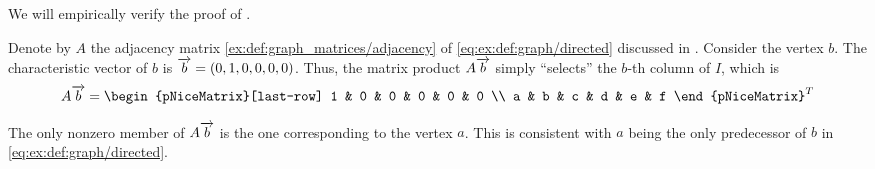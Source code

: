 \begin{example}\label{ex:thm:graphs_as_linear_transformations}
  We will empirically verify the proof of .

  Denote by \( A \) the adjacency matrix \eqref{ex:def:graph_matrices/adjacency} of \eqref{eq:ex:def:graph/directed} discussed in . Consider the vertex \( b \). The characteristic vector of \( b \) is \( \overrightarrow{b} = (0, 1, 0, 0, 0, 0) \). Thus, the matrix product \( A \overrightarrow{b} \) simply \enquote{selects} the \( b \)-th column of \( I \), which is
  \begin{equation*}
    A \vect{b}
    =
    \begin{pNiceMatrix}[last-row]
      1        & 0        & 0        & 0        & 0        & 0 \\
      a        & b        & c        & d        & e        & f
    \end{pNiceMatrix}^T
  \end{equation*}

  The only nonzero member of \( A \overrightarrow{b} \) is the one corresponding to the vertex \( a \). This is consistent with \( a \) being the only predecessor of \( b \) in \eqref{eq:ex:def:graph/directed}.
\end{example}

